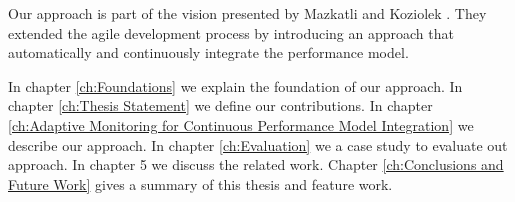 Our approach is part of the vision presented by Mazkatli and Koziolek \cite{mazkatli2018continuous}. They extended the agile development process by introducing an approach that automatically and continuously integrate the performance model. 

In chapter \ref{ch:Foundations} we explain the foundation of our approach. In chapter \ref{ch:Thesis Statement} we define our contributions. In chapter \ref{ch:Adaptive Monitoring for Continuous Performance Model Integration} we describe our approach. In chapter \ref{ch:Evaluation} we a case study to evaluate out approach. In chapter 5 we discuss the related work. Chapter \ref{ch:Conclusions and Future Work} gives a summary of this thesis and feature work. 

